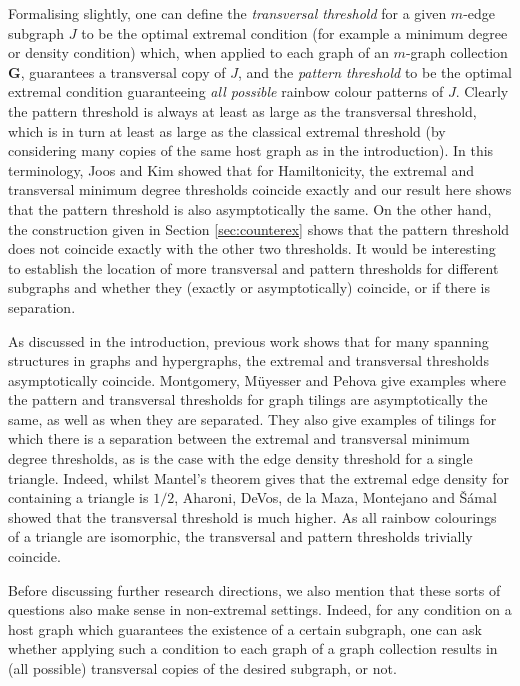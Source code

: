 \documentclass[11pt, dvipsnames]{amsart}
\theoremstyle{plain}
\theoremstyle{definition}
\newcommand{\mbf}[1]{\mathbf{#1}}
\begin{document}
Formalising slightly, one can define the \emph{transversal threshold} for a given $m$-edge subgraph $J$ to be the optimal extremal condition (for example a minimum degree or density condition) which, when applied to each graph of an $m$-graph collection $\mbf G$, guarantees a transversal copy of $J$, and the \emph{pattern threshold} to be the optimal extremal condition guaranteeing \emph{all possible} rainbow colour patterns of $J$. Clearly the pattern threshold is always at least as large as the transversal threshold, which is in turn at least as large as the classical extremal threshold (by considering many copies of the same host graph as in the introduction). In this terminology, Joos and Kim \cite{jooskim} showed that for Hamiltonicity, the extremal and transversal minimum degree thresholds coincide exactly and our result here shows that the pattern threshold is also asymptotically the same. On the other hand, the construction given in Section \ref{sec:counterex} shows that the pattern threshold does not coincide exactly with the other two thresholds. 
It would be interesting to establish the location of more transversal and pattern thresholds for different subgraphs and whether they (exactly or asymptotically) coincide, or if there is separation.

As discussed in the introduction, previous work shows that for many spanning structures in graphs and hypergraphs, the extremal and transversal thresholds asymptotically coincide. Montgomery, M\"uyesser and Pehova \cite{mmp} give examples where the pattern and transversal thresholds for graph tilings are asymptotically the same, as well as when they are separated. They also give examples of tilings for which there is a separation between the extremal and transversal minimum degree thresholds, as is the case with the edge density threshold for a single triangle. Indeed, whilst Mantel's theorem gives that the extremal edge density for containing a triangle is $1/2$, Aharoni, DeVos, de la Maza, Montejano and \v{S}\'amal~\cite{Aharoni} showed that the transversal threshold is much higher. 
As all rainbow colourings of a triangle are isomorphic, the transversal and pattern thresholds trivially coincide. 

Before discussing further research directions, we also mention that these sorts of questions also make sense in non-extremal settings. Indeed, for any condition on a host graph which guarantees the existence of a certain subgraph, one can ask whether applying such a condition to each graph of a graph collection results in (all possible) transversal copies of the desired subgraph, or not. 
\end{document}
